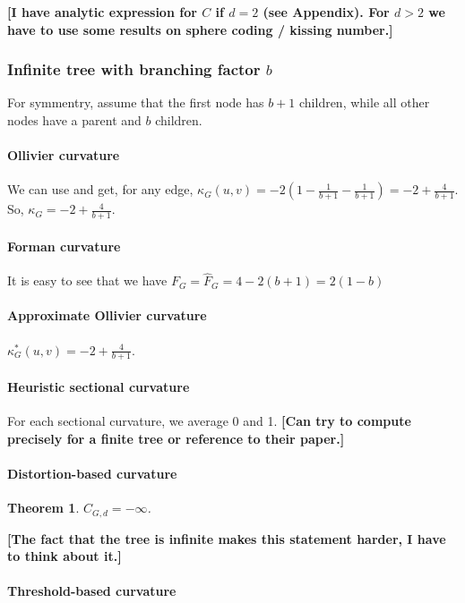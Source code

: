 \documentclass{article} %
\newtheorem{theorem}{Theorem}[section]
\begin{document}
\textbf{[I have analytic expression for $C$ if $d = 2$ (see Appendix). For $d > 2$ we have to use some results on sphere coding / kissing number.]}

\subsubsection{Infinite tree with branching factor $b$}

For symmentry, assume that the first node has $b+1$ children, while all other nodes have a parent and $b$ children.

\paragraph{Ollivier curvature} We can use  and get, for any edge,
$\kappa_G(u,v) = -2 \left(1 - \frac{1}{b+1} - \frac{1}{b+1} \right) = - 2 + \frac{4}{b+1}$. So, $\kappa_G = -2 + \frac{4}{b+1}$.

\paragraph{Forman curvature} 
It is easy to see that we have 
$F_G = \hat F_G = 4 - 2(b+1) = 2(1-b)$


\paragraph{Approximate Ollivier curvature} 
$\kappa_G^\ast(u,v) = -2 + \frac{4}{b+1}$.

\paragraph{Heuristic sectional curvature} For each sectional curvature, we average 0 and 1. \textbf{[Can try to compute precisely for a finite tree or reference to their paper.]}

\paragraph{Distortion-based curvature} 

\begin{theorem}\label{thm:tree_distortion} $C_{G,d} = -\infty$.
\end{theorem}

\textbf{[The fact that the tree is infinite makes this statement harder, I have to think about it.]}

\paragraph{Threshold-based curvature} 
\end{document}
